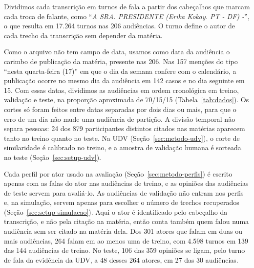 Dividimos cada transcrição em turnos de fala a partir dos cabeçalhos que marcam cada troca de
falante, como ``\textit{A SRA. PRESIDENTE (Erika Kokay. PT - DF) -}'', o que resulta em 17.264 turnos
nas 206 audiências. O turno define o autor de
cada trecho da transcrição sem depender da matéria.

Como o arquivo não tem campo de data, usamos como data da audiência o carimbo de publicação da
matéria, presente nas 206. Nas 157
menções do tipo ``nesta quarta-feira (17)'' em que o dia da semana confere com o calendário, a
publicação ocorre no mesmo dia da audiência em 142 casos e no dia seguinte em 15. Com essas datas,
dividimos as audiências em ordem cronológica em treino, validação e teste, na proporção aproximada de
70/15/15 (Tabela~\ref{tab:dados}). Os cortes só foram feitos entre datas separadas por dois dias ou
mais, para que o erro de um dia não mude uma audiência de partição. A divisão temporal não separa
pessoas: 24 dos 879 participantes distintos citados nas matérias aparecem tanto no treino quanto no
teste. Na UDV (Seção~\ref{sec:metodo-udv}), o corte de similaridade é calibrado no treino, e a amostra de
validação humana é sorteada no teste (Seção~\ref{sec:setup-udv}).

Cada perfil por ator usado na avaliação (Seção~\ref{sec:metodo-perfis}) é escrito apenas com as
falas do ator nas audiências de treino, e as opiniões das audiências de teste servem para avaliá-lo.
As audiências de validação não entram nos perfis e, na simulação, servem apenas para escolher o
número de trechos recuperados (Seção~\ref{sec:setup-simulacao}). Aqui o ator é identificado pelo cabeçalho da
transcrição, e não pela citação na matéria, então conta também quem falou numa audiência sem ser
citado na matéria dela. Dos 301 atores que falam em duas ou mais audiências, 264 falam em ao menos uma
de treino, com 4.598 turnos em 139 das 144 audiências de treino. No teste, 106 das 359 opiniões se
ligam, pelo turno de fala da evidência da UDV, a 48 desses 264 atores, em 27 das 30 audiências.


